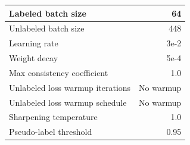 \begin{tabular}{L{\WWW}  R{\RRR}}
\\ \hline
Labeled batch size & 64
\\ \hline
Unlabeled batch size & 448
\\ \hline
Learning rate & 3e-2
\\ \hline
Weight decay & 5e-4
\\ \hline
Max consistency coefficient & 1.0
\\ \hline
Unlabeled loss warmup iterations & No warmup
\\ \hline
Unlabeled loss warmup schedule & No warmup
\\ \hline
Sharpening temperature & 1.0
\\ \hline
Pseudo-label threshold & 0.95
\end{tabular}